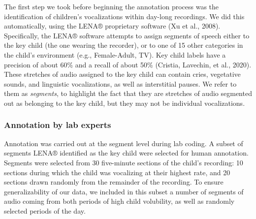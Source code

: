\documentclass[english,,man]{apa6}
\begin{document}
The first step we took before beginning the annotation process was the identification of children's vocalizations within day-long recordings. We did this automatically, using the LENA® proprietary software (Xu et al., 2008). Specifically, the LENA® software attempts to assign segments of speech either to the key child (the one wearing the recorder), or to one of 15 other categories in the child's environment (e.g., Female-Adult, TV). Key child labels have a precision of about 60\% and a recall of about 50\% (Cristia, Lavechin, et al., 2020). These stretches of audio assigned to the key child can contain cries, vegetative sounds, and linguistic vocalizations, as well as interstitial pauses. We refer to them as \emph{segments}, to highlight the fact that they are stretches of audio segmented out as belonging to the key child, but they may not be individual vocalizations.

\hypertarget{annotation-by-lab-experts}{%
\subsubsection{Annotation by lab experts}\label{annotation-by-lab-experts}}

Annotation was carried out at the segment level during lab coding. A subset of segments LENA® identified as the key child were selected for human annotation. Segments were selected from 30 five-minute sections of the child's recording: 10 sections during which the child was vocalizing at their highest rate, and 20 sections drawn randomly from the remainder of the recording. To ensure generalizability of our data, we included in this subset a number of segments of audio coming from both periods of high child volubility, as well as randomly selected periods of the day.
\end{document}
